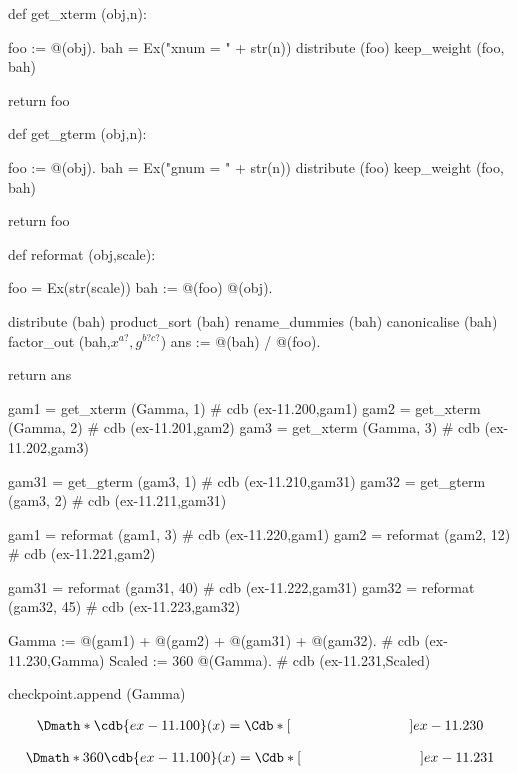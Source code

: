 \documentclass[12pt]{cdblatex}
\begin{document}
\begin{cadabra}
   def get_xterm (obj,n):

       foo := @(obj).
       bah  = Ex("xnum = " + str(n))
       distribute  (foo)
       keep_weight (foo, bah)

       return foo

   def get_gterm (obj,n):

       foo := @(obj).
       bah  = Ex("gnum = " + str(n))
       distribute  (foo)
       keep_weight (foo, bah)

       return foo

   def reformat (obj,scale):

      foo  = Ex(str(scale))
      bah := @(foo) @(obj).

      distribute     (bah)
      product_sort   (bah)
      rename_dummies (bah)
      canonicalise   (bah)
      factor_out     (bah,$x^{a?},g^{b? c?}$)
      ans := @(bah) / @(foo).

      return ans

   gam1  = get_xterm (Gamma, 1)                          # cdb (ex-11.200,gam1)
   gam2  = get_xterm (Gamma, 2)                          # cdb (ex-11.201,gam2)
   gam3  = get_xterm (Gamma, 3)                          # cdb (ex-11.202,gam3)

   gam31 = get_gterm (gam3,  1)                          # cdb (ex-11.210,gam31)
   gam32 = get_gterm (gam3,  2)                          # cdb (ex-11.211,gam31)

   gam1  = reformat (gam1,   3)                          # cdb (ex-11.220,gam1)
   gam2  = reformat (gam2,  12)                          # cdb (ex-11.221,gam2)

   gam31 = reformat (gam31, 40)                          # cdb (ex-11.222,gam31)
   gam32 = reformat (gam32, 45)                          # cdb (ex-11.223,gam32)

   Gamma  := @(gam1) + @(gam2) + @(gam31) + @(gam32).    # cdb (ex-11.230,Gamma)
   Scaled := 360 @(Gamma).                               # cdb (ex-11.231,Scaled)

   checkpoint.append (Gamma)

\end{cadabra}

\clearpage

\begin{dgroup*}
   \Dmath*{\cdb{ex-11.100}(x) = \Cdb*[\hskip 3.0cm]{ex-11.230}}
\end{dgroup*}

\begin{dgroup*}
   \Dmath*{360 \cdb{ex-11.100}(x) = \Cdb*[\hskip 3.0cm]{ex-11.231}}
\end{dgroup*}
\end{document}
